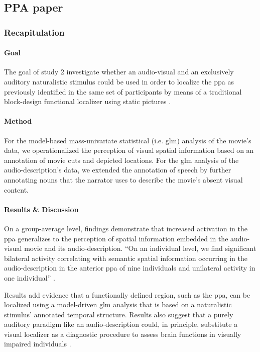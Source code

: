 \subsection{PPA paper}

\subsubsection{Recapitulation}

\paragraph{Goal}
The goal of study 2 investigate whether an audio-visual and an exclusively
auditory naturalistic stimulus could be used in order to localize the \ac{ppa}
as previously identified in the same set of participants by means of a
traditional block-design functional localizer using static pictures
\citep{sengupta2016extension}.


\paragraph{Method}
For the model-based mass-univariate statistical (i.e. \ac{glm}) analysis of the
movie's data, we operationalized the perception of visual spatial information
based on an annotation of movie cuts and depicted locations.
For the \ac{glm} analysis of the audio-description's data, we extended the
annotation of speech \citep{haeusler2021speechanno} by further annotating nouns
that the narrator uses to describe the movie's absent visual content.


\paragraph{Results \& Discussion}
On a group-average level, findings demonstrate that increased activation in the
\ac{ppa} generalizes to the perception of spatial information embedded in the
audio-visual movie and its audio-description.
``On an individual level, we find significant bilateral activity correlating
with semantic spatial information occurring in the audio-description in the
anterior \ac{ppa} of nine individuals and unilateral activity in one
individual'' \citep{haeusler2022processing}.

Results add evidence \citep[cf.][]{bartels2004mapping} that a functionally
defined region, such as the \ac{ppa}, can be localized using a model-driven
\ac{glm} analysis that is based on a naturalistic stimulus' annotated temporal
structure.
Results also suggest that a purely auditory paradigm like an audio-description
could, in principle, substitute a visual localizer as a diagnostic procedure to
assess brain functions in visually impaired individuals
\citep{haeusler2022processing}.



